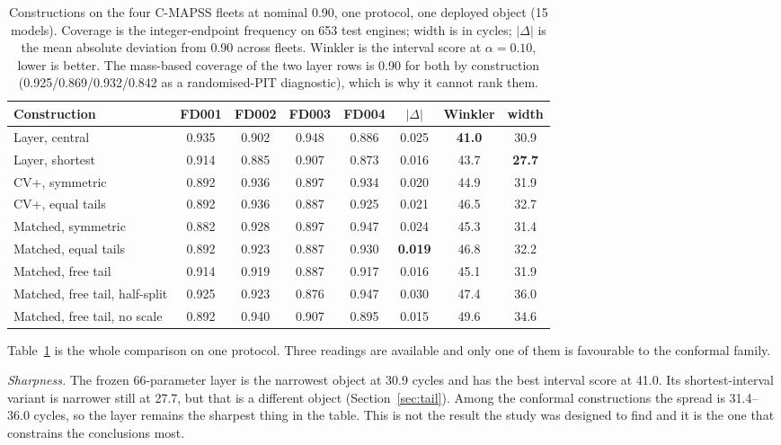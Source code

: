 \documentclass[journal]{IEEEtran}
\begin{document}
\begin{table}[t]
\centering
\caption{Constructions on the four C-MAPSS fleets at nominal 0.90, one protocol, one deployed
object (15 models). Coverage is the integer-endpoint frequency on 653 test engines; width is
in cycles; $|\Delta|$ is the mean absolute deviation from 0.90 across fleets. Winkler is the
interval score at $\alpha=0.10$, lower is better. The mass-based coverage of the two layer
rows is 0.90 for both by construction (0.925/0.869/0.932/0.842 as a randomised-PIT
diagnostic), which is why it cannot rank them.}
\label{tab:main}
\footnotesize
\setlength{\tabcolsep}{4.5pt}
\begin{tabular}{lccccccc}
\toprule
Construction & FD001 & FD002 & FD003 & FD004 & $|\Delta|$ & Winkler & width\\
\midrule
Layer, central                 & 0.935 & 0.902 & 0.948 & 0.886 & 0.025 & \textbf{41.0} & 30.9\\
Layer, shortest                & 0.914 & 0.885 & 0.907 & 0.873 & 0.016 & 43.7 & \textbf{27.7}\\
\midrule
CV+, symmetric                 & 0.892 & 0.936 & 0.897 & 0.934 & 0.020 & 44.9 & 31.9\\
CV+, equal tails               & 0.892 & 0.936 & 0.887 & 0.925 & 0.021 & 46.5 & 32.7\\
Matched, symmetric             & 0.882 & 0.928 & 0.897 & 0.947 & 0.024 & 45.3 & 31.4\\
Matched, equal tails           & 0.892 & 0.923 & 0.887 & 0.930 & \textbf{0.019} & 46.8 & 32.2\\
Matched, free tail             & 0.914 & 0.919 & 0.887 & 0.917 & 0.016 & 45.1 & 31.9\\
Matched, free tail, half-split & 0.925 & 0.923 & 0.876 & 0.947 & 0.030 & 47.4 & 36.0\\
Matched, free tail, no scale   & 0.892 & 0.940 & 0.907 & 0.895 & 0.015 & 49.6 & 34.6\\
\bottomrule
\end{tabular}
\end{table}

Table~\ref{tab:main} is the whole comparison on one protocol. Three readings are available
and only one of them is favourable to the conformal family.

\emph{Sharpness.} The frozen 66-parameter layer is the narrowest object at 30.9 cycles and has
the best interval score at 41.0. Its shortest-interval variant is narrower still at 27.7, but
that is a different object (Section~\ref{sec:tail}). Among the conformal constructions the
spread is 31.4--36.0 cycles, so the layer remains the sharpest thing in the table. This is not
the result the study was designed to find and it is the one that constrains the conclusions
most.
\end{document}
